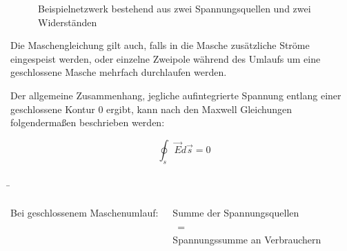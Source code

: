 \begin{frame}
{		
		
		
		
		
		
		
		
		
		\begin{figure}[h!]
			\begin{center}

				
				
			\end{center}
			\caption{Beispielnetzwerk bestehend aus zwei Spannungsquellen und zwei Widerständen}
			\label{fig:masche}
		\end{figure}
		
		Die Maschengleichung gilt auch, falls in die Masche zusätzliche Ströme eingespeist werden,
		oder einzelne Zweipole während des Umlaufs um eine geschlossene Masche mehrfach durchlaufen werden.
		
		Der allgemeine Zusammenhang, jegliche aufintegrierte Spannung entlang einer geschlossene Kontur 0 ergibt, kann
		nach den Maxwell Gleichungen folgendermaßen beschrieben werden: 
		
		\begin{equation}
			\oint_{s} \vec{E} d\vec{s} = 0
		\end{equation}
		
		
		
	}
	
	
	\b{
		\begin{columns}
			
			\vspace{-70pt}
			
			Bei geschlossenem Maschenumlauf:
			\vspace{-5pt}
			\begin{Merksatz}{}
				
				\begin{center}


					Summe der Spannungsquellen\\
					\quad \quad\ \quad =\\
					Spannungssumme an Verbrauchern
					
				\end{center}
			\end{Merksatz}
			
			
			\vspace{10pt}
			

\end{columns}}
\end{frame}
